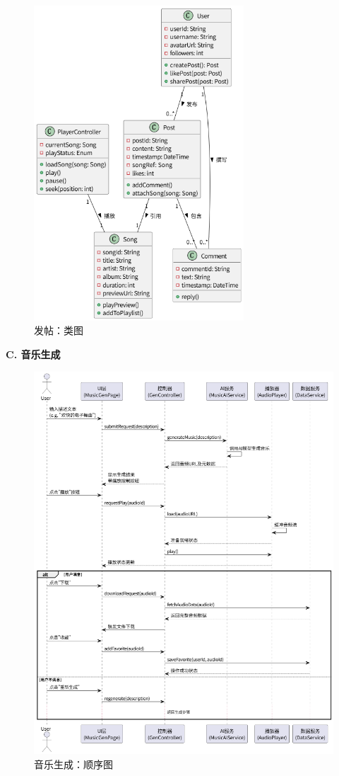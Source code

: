 \documentclass{base}
\numberwithin{figure}{section} %
\begin{document}
\begin{figure}[H]
    \centering
    \includegraphics[width=0.7\textwidth]{images/post-2.png}
    \caption{发帖：类图}
\end{figure}

\textbf{C. 音乐生成}

\begin{figure}[H]
    \centering
    \includegraphics[width=\textwidth]{images/gen-1.png}
    \caption{音乐生成：顺序图}
\end{figure}
\end{document}
